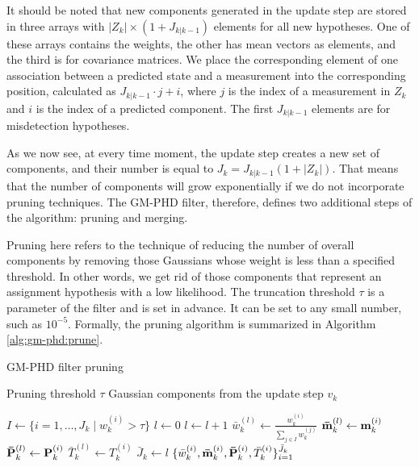 It should be noted that new components generated in the update step are stored in three arrays with $|Z_k| \times (1 + J_{k|k-1})$ elements for all new hypotheses. One of these arrays contains the weights, the other has mean vectors as elements, and the third is for covariance matrices. We place the corresponding element of one association between a predicted state and a measurement into the corresponding position, calculated as $J_{k|k-1} \cdot j + i$, where $j$ is the index of a measurement in $Z_k$ and $i$ is the index of a predicted component. The first $J_{k|k-1}$ elements are for misdetection hypotheses.

As we now see, at every time moment, the update step creates a new set of components, and their number is equal to $J_k = J_{k|k-1}(1 + |Z_k|)$. That means that the number of components will grow exponentially if we do not incorporate pruning techniques. The GM-PHD filter, therefore, defines two additional steps of the algorithm: pruning and merging.

Pruning here refers to the technique of reducing the number of overall components by removing those Gaussians whose weight is less than a specified threshold. In other words, we get rid of those components that represent an assignment hypothesis with a low likelihood. The truncation threshold $\tau$ is a parameter of the filter and is set in advance. It can be set to any small number, such as $10^{-5}$. Formally, the pruning algorithm is summarized in Algorithm \ref{alg:gm-phd:prune}.

\begin{algorithm}
\caption{GM-PHD filter pruning}\label{alg:gm-phd:prune}
\begin{algorithmic}[1]
    \Require Pruning threshold $\tau$
    \Require Gaussian components from the update step $v_k$
    \item[]
        \State $I \gets \{ i = 1, \ldots, J_k \mid w_k^{(i)} > \tau \}$
        \State $l \gets 0$
            \State $l \gets l + 1$
            \State $\bar{w}_{k}^{(l)} \gets \frac{w_{k}^{(i)}}{\sum_{j \in I} w_{k}^{(j)}}$
            \State $\vecat{\bar{m}}{k}^{(l)} \gets \vecat{m}{k}^{(i)}$
            \State $\vecat{\bar{P}}{k}^{(l)} \gets \vecat{P}{k}^{(i)}$
            \State $\bar{T}_{k}^{(l)} \gets T_{k}^{(i)}$
        \EndFor
        \State $\bar{J}_{k} \gets l$
        \State \Return $\{ \bar{w}_{k}^{(i)}, \vecat{\bar{m}}{k}^{(i)}, \vecat{\bar{P}}{k}^{(i)}, \bar{T}_{k}^{(i)}\}_{i=1}^{\bar{J}_{k}}$
    \EndProcedure
\end{algorithmic}
\end{algorithm}

